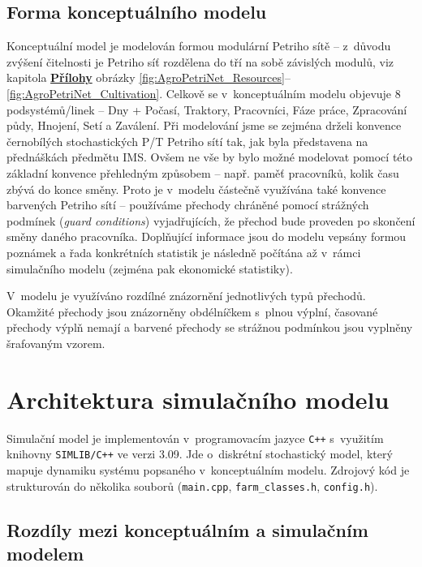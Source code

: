 \documentclass[11pt,a4paper]{article}
\begin{document}
\subsection{Forma konceptuálního modelu}\label{forma-konceptualniho-modelu}

Konceptuální model je modelován formou modulární Petriho sítě -- z~důvodu zvýšení čitelnosti je Petriho síť rozdělena do tří na sobě závislých modulů, viz kapitola \textbf{\hyperref[prilohy]{Přílohy}} obrázky \ref{fig:AgroPetriNet_Resources}--\ref{fig:AgroPetriNet_Cultivation}. Celkově se v~konceptuálním modelu objevuje 8 podsystémů/linek -- Dny + Počasí, Traktory, Pracovníci, Fáze práce, Zpracování půdy, Hnojení, Setí a Zaválení. Při modelování jsme se zejména drželi konvence černobílých stochastických P/T Petriho sítí tak, jak byla představena na přednáškách předmětu IMS. Ovšem ne vše by bylo možné modelovat pomocí této základní konvence přehledným způsobem -- např. paměť pracovníků, kolik času zbývá do konce směny. Proto je v~modelu částečně využívána také konvence barvených Petriho sítí -- používáme přechody chráněné pomocí strážných podmínek (\emph{guard conditions}) vyjadřujících, že přechod bude proveden po skončení směny daného pracovníka. Doplňující informace jsou do modelu vepsány formou poznámek a řada konkrétních statistik je následně počítána až v~rámci simulačního modelu (zejména pak ekonomické statistiky).

V~modelu je využíváno rozdílné znázornění jednotlivých typů přechodů. Okamžité přechody jsou znázorněny obdélníčkem s~plnou výplní, časované přechody výplň nemají a barvené přechody se strážnou podmínkou jsou vyplněny šrafovaným vzorem.



\section{Architektura simulačního modelu}

Simulační model je implementován v~programovacím jazyce \texttt{C++} s~využitím knihovny \texttt{SIMLIB/C++} ve verzi 3.09\cite{simlib}. Jde o~diskrétní stochastický model, který mapuje dynamiku systému popsaného v~konceptuálním modelu. Zdrojový kód je strukturován do několika souborů (\texttt{main.cpp}, \texttt{farm\_classes.h}, \texttt{config.h}).

\subsection{Rozdíly mezi konceptuálním a simulačním modelem}
\end{document}
